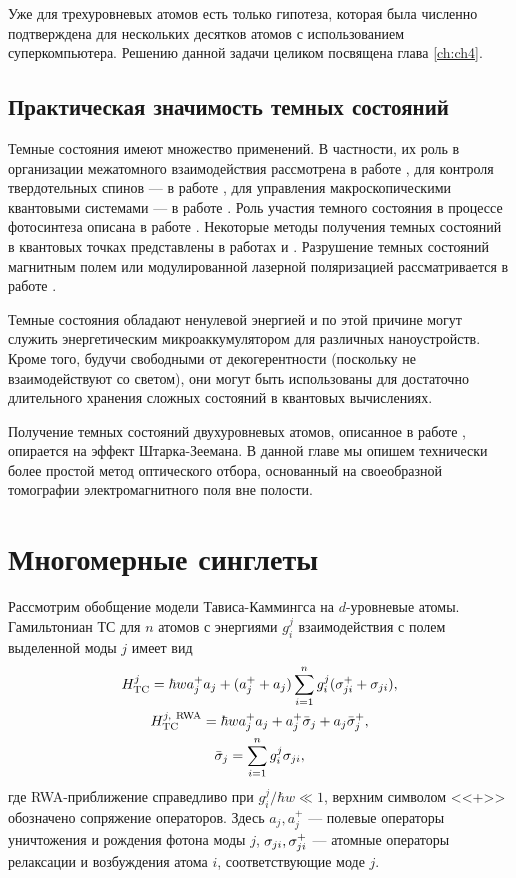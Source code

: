 Уже для трехуровневых атомов есть только гипотеза, которая была численно подтверждена для нескольких десятков атомов с использованием суперкомпьютера. Решению данной задачи целиком посвящена глава \ref{ch:ch4}.

\subsection{Практическая значимость темных состояний}\label{subsec:ch3/subsect2}
Темные состояния имеют множество применений. В частности, их роль в организации межатомного взаимодействия рассмотрена в работе \cite{dark_states_properties_andre}, для контроля твердотельных спинов --- в работе \cite{dark_states_properties_hansom}, для управления макроскопическими квантовыми системами --- в работе \cite{dark_states_properties_bose_einstein}. Роль участия темного состояния в процессе фотосинтеза описана в работе \cite{dark_states_properties_photosynthesis}. Некоторые методы получения темных состояний в квантовых точках представлены в работах \cite{dark_states_properties_poltl} и \cite{dark_states_properties_tanamoto}. Разрушение темных состояний магнитным полем или модулированной лазерной поляризацией рассматривается в работе \cite{dark_states_properties_destabilization}.

Темные состояния обладают ненулевой энергией и по этой причине могут служить энергетическим микроаккумулятором для различных
наноустройств. Кроме того, будучи свободными от декогерентности (поскольку не взаимодействуют со светом), они могут быть использованы для достаточно длительного хранения сложных состояний в квантовых вычислениях.

Получение темных состояний двухуровневых атомов, описанное в работе \cite{dark_stetes_properties_tanamoto}, опирается на эффект Штарка-Зеемана. В данной главе мы опишем технически более простой метод оптического отбора, основанный на своеобразной томографии электромагнитного поля вне полости.

\section{Многомерные синглеты}\label{sec:ch3/sect2}
Рассмотрим обобщение модели Тависа-Каммингса на $d$-уровневые атомы. Гамильтониан ТС для $n$ атомов с энергиями $g^{j}_{i}$ взаимодействия с полем выделенной моды $j$ имеет вид
\begin{gather}
	H^j_{\text{TC}} = \hbar w a_{j}^{+}a_j + (a_{j}^{+} + a_{j})\sum\limits_{i=1}^{n}g^{j}_{i}(\sigma_{ji}^{+} + \sigma_{ji}),\notag\\
	H^{j,\ \text{RWA}}_{\text{TC}} = \hbar w a_{j}^{+}a_{j} + a_{j}^{+}\bar{\sigma}_{j} + a_{j}\bar{\sigma}_{j}^{+},\\
	\bar{\sigma}_{j} = \sum\limits_{i=1}^ng^{j}_{i}\sigma_{ji},\notag
\end{gather}
где RWA-приближение \cite{rwa_rabi_1,rwa_rabi_2,ozhigov_qq} справедливо при $g^{j}_{i}/\hbar w\ll 1$, верхним символом <<+>> обозначено сопряжение операторов. Здесь $a_{j},a_{j}^{+}$ --- полевые операторы уничтожения и рождения фотона моды $j$, $\sigma_{ji},\sigma_{ji}^{+}$ --- атомные операторы релаксации и возбуждения атома $i$, соответствующие моде $j$.


